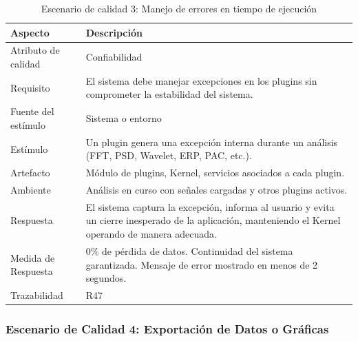 \documentclass[11pt,a4paper]{article}
\DeclareRobustCommand{\_}{\textunderscore\allowbreak}
\begin{document}
\begin{table}[H]
\centering
\caption{Escenario de calidad 3: Manejo de errores en tiempo de ejecución}
\label{tab:escenario3}
\begin{tabularx}{\textwidth}{|l|X|}
\hline
\textbf{Aspecto} & \textbf{Descripción} \\
\hline
Atributo de calidad & Confiabilidad \\
\hline
Requisito & El sistema debe manejar excepciones en los plugins sin comprometer la estabilidad del sistema. \\
\hline
Fuente del estímulo & Sistema o entorno \\
\hline
Estímulo & Un plugin genera una excepción interna durante un análisis (FFT, PSD, Wavelet, ERP, PAC, etc.). \\
\hline
Artefacto & Módulo de plugins, Kernel, servicios asociados a cada plugin. \\
\hline
Ambiente & Análisis en curso con señales cargadas y otros plugins activos. \\
\hline
Respuesta & El sistema captura la excepción, informa al usuario y evita un cierre inesperado de la aplicación, manteniendo el Kernel operando de manera adecuada. \\
\hline
Medida de Respuesta & 0\% de pérdida de datos. Continuidad del sistema garantizada. Mensaje de error mostrado en menos de 2 segundos. \\
\hline
Trazabilidad & R47 \\
\hline
\end{tabularx}
\end{table}

\subsubsection{Escenario de Calidad 4: Exportación de Datos o Gráficas}
\end{document}
